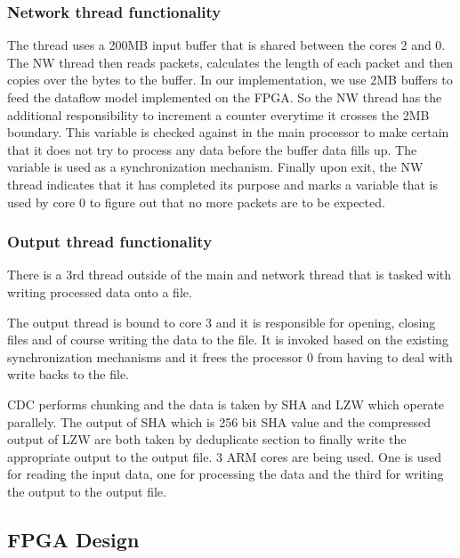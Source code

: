 \documentclass{article}
\begin{document}
\subsubsection{Network thread functionality} 

The thread uses a 200MB input buffer that is shared between the cores 2 and 0.
\newline
The NW thread then reads packets, calculates the length of each packet and then copies over the bytes to the buffer.
\newline
In our implementation, we use 2MB buffers to feed the dataflow model implemented on the FPGA.
\newline
So the NW thread has the additional responsibility to increment a counter everytime it crosses the 2MB boundary. 
This variable is checked against in the main processor to make certain that it does not try to process any data before the buffer data fills up. The variable is used as a synchronization mechanism.
\newline
Finally upon exit, the NW thread indicates that it has completed its purpose and marks a variable that is used by core 0 to figure out that no more packets are to be expected.
\newline

\subsubsection{Output thread functionality}

There is a 3rd thread outside of the main and network thread that is tasked with writing processed data onto a file. 
\par
The output thread is bound to core 3 and it is responsible for opening, closing files and of course writing the data to the file. 
It is invoked based on the existing synchronization mechanisms and it frees the processor 0 from having to deal with write backs to the file. 
\newline

CDC performs chunking and the data is taken by SHA and LZW which operate parallely. The output of SHA which is 256 bit SHA value and the compressed output of LZW are both taken by deduplicate section to finally write the appropriate output to the output file. 
3 ARM cores are being used. One is used for reading the input data, one for processing the data and the third for writing the output to the output file.  

\subsection{FPGA Design}
\end{document}
